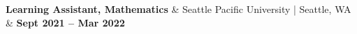 \textbf{Learning Assistant, Mathematics} & 
Seattle Pacific University | Seattle, WA & 
\textbf{Sept 2021 -- Mar 2022}